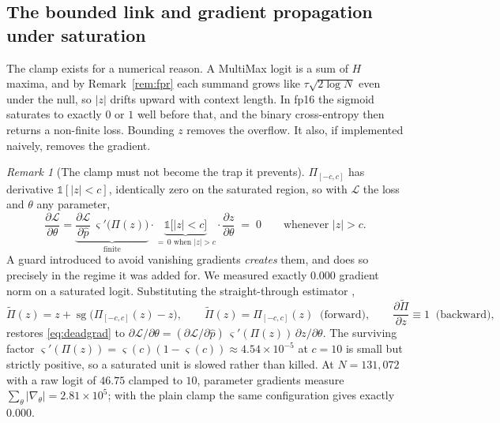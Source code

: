 \documentclass[10pt]{article}
\theoremstyle{plain}
\theoremstyle{definition}
\theoremstyle{remark}
\newtheorem{remark}[theorem]{Remark}
\newcommand{\sg}{\operatorname{sg}}
\begin{document}
\subsection{The bounded link and gradient propagation under saturation}
\label{sec:ste}

The clamp exists for a numerical reason. A MultiMax logit is a sum of $H$ maxima, and by
Remark~\ref{rem:fpr} each summand grows like $\tau\sqrt{2\log N}$ even under the null, so
$|z|$ drifts upward with context length. In fp16 the sigmoid saturates to exactly $0$ or
$1$ well before that, and the binary cross-entropy then returns a non-finite loss. Bounding
$z$ removes the overflow. It also, if implemented naively, removes the gradient.

\begin{remark}[The clamp must not become the trap it prevents]
\label{rem:clamp}
$\Pi_{[-c,c]}$ has derivative $\mathbb{1}[|z|<c]$, identically zero on the saturated
region, so with $\mathcal{L}$ the loss and $\theta$ any parameter,
\begin{equation}
  \frac{\partial\mathcal{L}}{\partial\theta}
  = \underbrace{\frac{\partial\mathcal{L}}{\partial\hat p}\,
    \varsigma'\!\big(\Pi(z)\big)}_{\text{finite}}
  \cdot\underbrace{\mathbb{1}\big[|z|<c\big]}_{=\,0 \text{ when } |z|>c}
  \cdot\frac{\partial z}{\partial\theta}
  \;=\;0
  \qquad\text{whenever } |z|>c .
  \label{eq:deadgrad}
\end{equation}
A guard introduced to avoid vanishing gradients \emph{creates} them, and does so precisely
in the regime it was added for. We measured exactly $0.000$ gradient norm on a saturated
logit. Substituting the straight-through estimator \citep{bengio2013estimating},
\begin{equation}
  \widetilde\Pi(z)=z+\sg\!\big(\Pi_{[-c,c]}(z)-z\big),
  \qquad
  \widetilde\Pi(z)=\Pi_{[-c,c]}(z)\ \text{ (forward)},
  \qquad
  \frac{\partial\widetilde\Pi}{\partial z}\equiv1\ \text{ (backward)},
  \label{eq:ste}
\end{equation}
restores \eqref{eq:deadgrad} to
$\partial\mathcal{L}/\partial\theta=(\partial\mathcal{L}/\partial\hat p)\,
\varsigma'(\Pi(z))\,\partial z/\partial\theta$. The surviving factor
$\varsigma'(\Pi(z))=\varsigma(c)(1-\varsigma(c))\approx4.54\times10^{-5}$ at $c=10$ is
small but strictly positive, so a saturated unit is slowed rather than killed. At
$N{=}131{,}072$ with a raw logit of $46.75$ clamped to $10$, parameter gradients measure
$\sum_\theta|\nabla_\theta|=2.81\times10^{5}$; with the plain clamp the same configuration
gives exactly $0.000$.
\end{remark}
\end{document}
